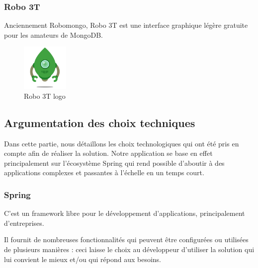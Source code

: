 \subsubsection*{Robo 3T}
Anciennement Robomongo, Robo 3T est une interface graphique l\'eg\`ere gratuite pour les amateurs de MongoDB.
\begin{figure}[!ht]\centering
\includegraphics[width=0.2\textwidth]{chapitres/chapitrex/figures/robot3t.png}
\caption{Robo 3T logo}
\label{fig:robot3t}
\end{figure}

\subsection{Argumentation des choix techniques}
Dans cette partie, nous d\'etaillons les choix technologiques qui ont \'et\'e pris en compte afin de r\'ealiser la solution. Notre application se base en effet principalement sur l'\'ecosyst\`eme Spring qui rend possible d'aboutir \`a des applications complexes et passantes \`a l'\'echelle en un temps court.
\subsubsection*{Spring}
C'est un  framework libre pour le d\'eveloppement d'applications, principalement d'entreprises.

Il fournit de nombreuses fonctionnalit\'es qui peuvent \^etre configur\'ees ou utilis\'ees de plusieurs mani\`eres : ceci laisse le choix au d\'eveloppeur d'utiliser la solution qui lui convient le mieux et/ou qui r\'epond aux besoins.

